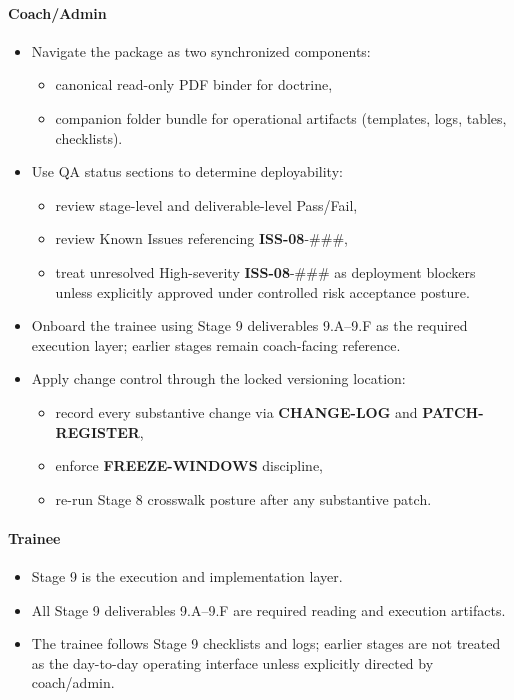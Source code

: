 \documentclass[10pt]{article}
\begin{document}
\paragraph*{Coach/Admin}

\begin{itemize}
\item Navigate the package as two synchronized components:
  \begin{itemize}
  \item canonical read-only PDF binder for doctrine,
  \item companion folder bundle for operational artifacts (templates, logs, tables, checklists).
  \end{itemize}
\item Use QA status sections to determine deployability:
  \begin{itemize}
  \item review stage-level and deliverable-level Pass/Fail,
  \item review Known Issues referencing \textbf{ISS-08}-\#\#\#,
  \item treat unresolved High-severity \textbf{ISS-08}-\#\#\# as deployment blockers unless explicitly approved under controlled risk acceptance posture.
  \end{itemize}
\item Onboard the trainee using Stage 9 deliverables 9.A–9.F as the required execution layer; earlier stages remain coach-facing reference.
\item Apply change control through the locked versioning location:
  \begin{itemize}
  \item record every substantive change via \textbf{CHANGE-LOG} and \textbf{PATCH-REGISTER},
  \item enforce \textbf{FREEZE-WINDOWS} discipline,
  \item re-run Stage 8 crosswalk posture after any substantive patch.
  \end{itemize}
\end{itemize}

\paragraph*{Trainee}

\begin{itemize}
\item Stage 9 is the execution and implementation layer.
\item All Stage 9 deliverables 9.A–9.F are required reading and execution artifacts.
\item The trainee follows Stage 9 checklists and logs; earlier stages are not treated as the day-to-day operating interface unless explicitly directed by coach/admin.
\end{itemize}
\end{document}
